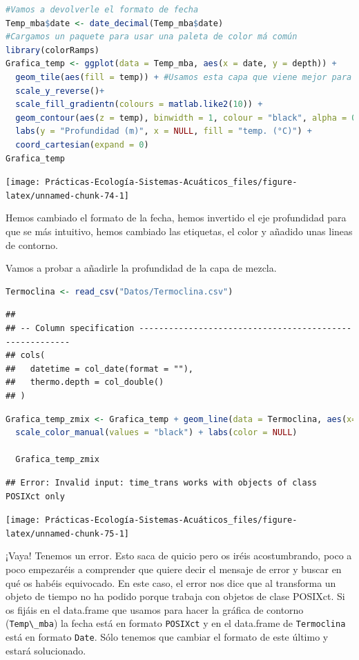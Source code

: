 \documentclass[
]{book}
\newcommand{\passthrough}[1]{#1}
\begin{document}
\begin{lstlisting}[language=R]
#Vamos a devolverle el formato de fecha
Temp_mba$date <- date_decimal(Temp_mba$date)
#Cargamos un paquete para usar una paleta de color má común
library(colorRamps)
Grafica_temp <- ggplot(data = Temp_mba, aes(x = date, y = depth)) +
  geom_tile(aes(fill = temp)) + #Usamos esta capa que viene mejor para este tipo de gráficos pero podíamos haber usado geom_point
  scale_y_reverse()+
  scale_fill_gradientn(colours = matlab.like2(10)) +
  geom_contour(aes(z = temp), binwidth = 1, colour = "black", alpha = 0.2) +
  labs(y = "Profundidad (m)", x = NULL, fill = "temp. (°C)") +
  coord_cartesian(expand = 0)
Grafica_temp
\end{lstlisting}

\texttt{[image: Prácticas-Ecología-Sistemas-Acuáticos\_files/figure-latex/unnamed-chunk-74-1]}

Hemos cambiado el formato de la fecha, hemos invertido el eje profundidad para que se más intuitivo, hemos cambiado las etiquetas, el color y añadido unas lineas de contorno.

Vamos a probar a añadirle la profundidad de la capa de mezcla.

\begin{lstlisting}[language=R]
Termoclina <- read_csv("Datos/Termoclina.csv")
\end{lstlisting}

\begin{lstlisting}
## 
## -- Column specification --------------------------------------------------------
## cols(
##   datetime = col_date(format = ""),
##   thermo.depth = col_double()
## )
\end{lstlisting}

\begin{lstlisting}[language=R]
  Grafica_temp_zmix <- Grafica_temp + geom_line(data = Termoclina, aes(x=datetime, y = thermo.depth, color = "Termoclina"), size = 0.2)+
  scale_color_manual(values = "black") + labs(color = NULL)
  
  Grafica_temp_zmix
\end{lstlisting}

\begin{lstlisting}
## Error: Invalid input: time_trans works with objects of class POSIXct only
\end{lstlisting}

\texttt{[image: Prácticas-Ecología-Sistemas-Acuáticos\_files/figure-latex/unnamed-chunk-75-1]}

¡Vaya! Tenemos un error. Esto saca de quicio pero os iréis acostumbrando, poco a poco empezaréis a comprender que quiere decir el mensaje de error y buscar en qué os habéis equivocado. En este caso, el error nos dice que al transforma un objeto de tiempo no ha podido porque trabaja con objetos de clase POSIXct. Si os fijáis en el data.frame que usamos para hacer la gráfica de contorno (\passthrough{\lstinline!Temp\_mba!}) la fecha está en formato \passthrough{\lstinline!POSIXct!} y en el data.frame de \passthrough{\lstinline!Termoclina!} está en formato \passthrough{\lstinline!Date!}. Sólo tenemos que cambiar el formato de este último y estará solucionado.
\end{document}
